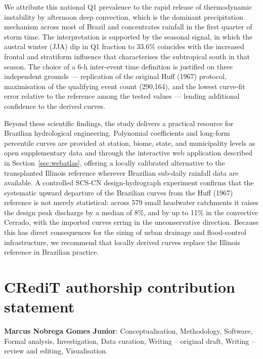 \documentclass[a4paper,fleqn]{cas-sc}
\begin{document}
We attribute this national Q1 prevalence to the rapid release of
thermodynamic instability by afternoon deep convection, which is the
dominant precipitation mechanism across most of Brazil and concentrates
rainfall in the first quarter of storm time. The interpretation is
supported by the seasonal signal, in which the austral winter (JJA)
dip in Q1 fraction to 33.6\% coincides with the increased frontal and
stratiform influence that characterises the subtropical south in that
season. The choice of a 6-h inter-event time definition is justified
on three independent grounds — replication of the original Huff (1967)
protocol, maximisation of the qualifying event count (290,164), and
the lowest curve-fit error relative to the reference among the tested
values — lending additional confidence to the derived curves.

Beyond these scientific findings, the study delivers a practical
resource for Brazilian hydrological engineering. Polynomial
coefficients and long-form percentile curves are provided at station,
biome, state, and municipality levels as open supplementary data and
through the interactive web application described in
Section~\ref{sec:webatlas}, offering a locally calibrated alternative
to the transplanted Illinois reference wherever Brazilian sub-daily
rainfall data are available. A controlled SCS-CN design-hydrograph
experiment confirms that the systematic upward departure of the
Brazilian curves from the Huff (1967) reference is not merely
statistical: across 579 small headwater catchments it raises the design
peak discharge by a median of 8\%, and by up to 11\% in the convective
Cerrado, with the imported curves erring in the unconservative
direction. Because this has direct consequences for the sizing of urban
drainage and flood-control infrastructure, we recommend that locally
derived curves replace the Illinois reference in Brazilian practice.

\section*{CRediT authorship contribution statement}

\textbf{Marcus Nobrega Gomes Junior}: Conceptualisation, Methodology,
Software, Formal analysis, Investigation, Data curation, Writing –
original draft, Writing – review and editing, Visualisation.

\end{document}

